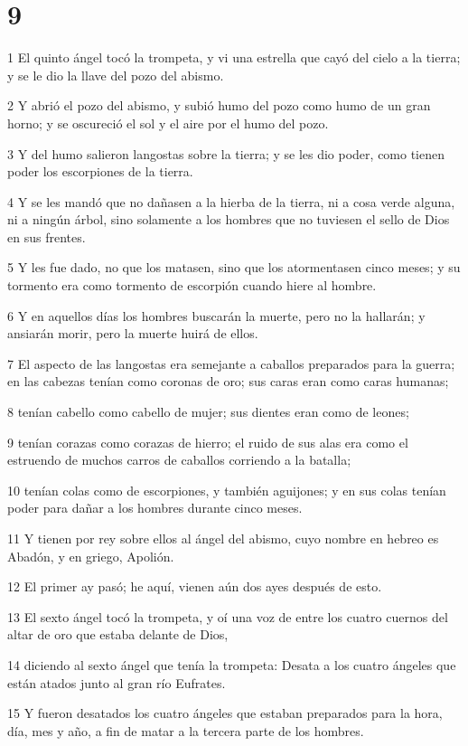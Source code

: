 \chapter{9}

\par 1 El quinto ángel tocó la trompeta, y vi una estrella que cayó del cielo a la tierra; y se le dio la llave del pozo del abismo.
\par 2 Y abrió el pozo del abismo, y subió humo del pozo como humo de un gran horno; y se oscureció el sol y el aire por el humo del pozo.
\par 3 Y del humo salieron langostas sobre la tierra; y se les dio poder, como tienen poder los escorpiones de la tierra.
\par 4 Y se les mandó que no dañasen a la hierba de la tierra, ni a cosa verde alguna, ni a ningún árbol, sino solamente a los hombres que no tuviesen el sello de Dios en sus frentes.
\par 5 Y les fue dado, no que los matasen, sino que los atormentasen cinco meses; y su tormento era como tormento de escorpión cuando hiere al hombre.
\par 6 Y en aquellos días los hombres buscarán la muerte, pero no la hallarán; y ansiarán morir, pero la muerte huirá de ellos.
\par 7 El aspecto de las langostas era semejante a caballos preparados para la guerra; en las cabezas tenían como coronas de oro; sus caras eran como caras humanas;
\par 8 tenían cabello como cabello de mujer; sus dientes eran como de leones;
\par 9 tenían corazas como corazas de hierro; el ruido de sus alas era como el estruendo de muchos carros de caballos corriendo a la batalla;
\par 10 tenían colas como de escorpiones, y también aguijones; y en sus colas tenían poder para dañar a los hombres durante cinco meses.
\par 11 Y tienen por rey sobre ellos al ángel del abismo, cuyo nombre en hebreo es Abadón, y en griego, Apolión.
\par 12 El primer ay pasó; he aquí, vienen aún dos ayes después de esto.
\par 13 El sexto ángel tocó la trompeta, y oí una voz de entre los cuatro cuernos del altar de oro que estaba delante de Dios,
\par 14 diciendo al sexto ángel que tenía la trompeta: Desata a los cuatro ángeles que están atados junto al gran río Eufrates.
\par 15 Y fueron desatados los cuatro ángeles que estaban preparados para la hora, día, mes y año, a fin de matar a la tercera parte de los hombres.
